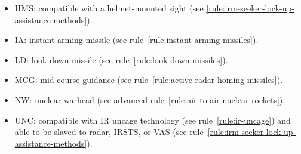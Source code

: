 \begin{landscape}
{\begin{fullwidthtable}
\begin{tablenote}{\linewidth}
\begin{itemize}[nosep]
    \item HMS: compatible with a helmet-mounted sight (see \ref{rule:irm-seeker-lock-up-assistance-methods}).
    \item IA: instant-arming missile (see rule~\ref{rule:instant-arming-missiles}).
    \item LD: look-down missile (see rule~\ref{rule:look-down-missiles}).
    \item MCG: mid-course guidance (see rule~\ref{rule:active-radar-homing-missiles}).
    \item NW: nuclear warhead (see advanced rule~\ref{rule:air-to-air-nuclear-rockets}).
    \item UNC: compatible with IR uncage technology (see rule~\ref{rule:ir-uncage}) and able to be slaved to radar, IRSTS, or VAS (see rule~\ref{rule:irm-seeker-lock-up-assistance-methods}).
\end{itemize}
\end{tablenote}
\end{fullwidthtable}
\clearpage
}
\end{landscape}
